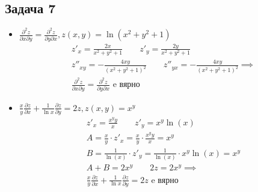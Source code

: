 \documentclass[a4paper,fleqn,12pt]{article}
\theoremstyle{definition}
\begin{document}
\subsection*{Задача 7}

\begin{itemize}
\item $\frac{\partial^2 z}{\partial x \partial y} = \frac{\partial^2 z}{\partial y \partial x}, z(x,y) = \ln(x^2+y^2+1)$
\begin{gather*}
z'_x = \frac{2x}{x^2 + y^2 + 1} \qquad z'_y = \frac{2y}{x^2 + y^2 + 1} \\
z''_{xy} = -\frac{4xy}{(x^2+y^2 + 1)^2} \qquad z''_{yx} = -\frac{4xy}{(x^2+y^2 + 1)^2} \implies \\
\frac{\partial^2 z}{\partial x \partial y} = \frac{\partial^2 z}{\partial y \partial x} \text{ e вярно}
\end{gather*}

\item $\frac{x}{y}\frac{\partial z}{\partial x} + \frac{1}{\ln x} \frac{\partial z}{\partial y } = 2z, z(x,y) =x^y$
\begin{gather*}
z'_x = \frac{x^y y}{x} \qquad z'_y = x^y \ln(x) \\
A = \frac{x}{y} \cdot z'_x = \frac{x}{y} \cdot  \frac{x^y y}{x} = x^y \\
B = \frac{1}{\ln(x)} \cdot z'_y = \frac{1}{\ln(x)} \cdot x^y \ln(x) = x^y \\
A + B = 2x^y \qquad 2z = 2x^y \implies \\
\frac{x}{y}\frac{\partial z}{\partial x} + \frac{1}{\ln x} \frac{\partial z}{\partial y } = 2z \text{ e вярно}
\end{gather*}


\end{itemize}
\end{document}
